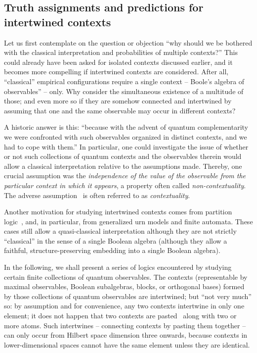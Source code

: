 \subsection{Truth assignments and predictions for intertwined contexts}

Let us first contemplate on the question or objection
{ ``why should we be bothered with the classical interpretation and probabilities of multiple contexts?''}
This could already have been asked for isolated contexts discussed earlier, and it becomes more compelling if intertwined contexts are considered.
After all, ``classical'' empirical configurations require a single context -- Boole's algebra of observables'' -- only.
Why consider the simultaneous existence of a multitude of those; and even more so if they are
somehow connected and intertwined by assuming that one and the same observable may occur in different contexts?

A historic answer is this: ``because with the advent of quantum complementarity we were confronted with such observables organized in distinct contexts,
and we had to cope with them.''
In particular, one could investigate the issue of whether or not such collections of quantum contexts and the observables therein would allow a classical interpretation
relative to the assumptions made.
Thereby, one crucial assumption was the {\em independence of the value of the observable from the particular context in which it appears},
a property often called {\em non-contextuality}.
The adverse assumption~\cite{bohr-1949,bell-66} is often referred to as {\em contextuality}.

Another motivation for studying intertwined contexts comes from partition logic~\cite{svozil-2001-eua,svozil-2008-ql},
and, in particular, from generalized urn models and finite automata.
These cases still allow a quasi-classical interpretation although they are not strictly ``classical'' in the sense of a single Boolean algebra
(although they allow a faithful, structure-preserving embedding into a single Boolean algebra).

In the following, we shall present a series of logics
encountered by studying certain finite collections of quantum observables.
The contexts (representable by  maximal observables, Boolean subalgebras, blocks, or orthogonal bases)
formed by those collections of quantum observables
are intertwined; but ``not very much'' so: by assumption and for convenience, any two contexts intertwine in only one element; it does not happen that two contexts
are  pasted~\cite{greechie:71,kalmbach-83,nav:91,pulmannova-91}
along with two or more atoms.
Such intertwines -- connecting contexts by pasting them together -- can only occur from Hilbert space dimension three onwards,
because contexts in lower-dimensional spaces cannot have the same element unless they are identical.

